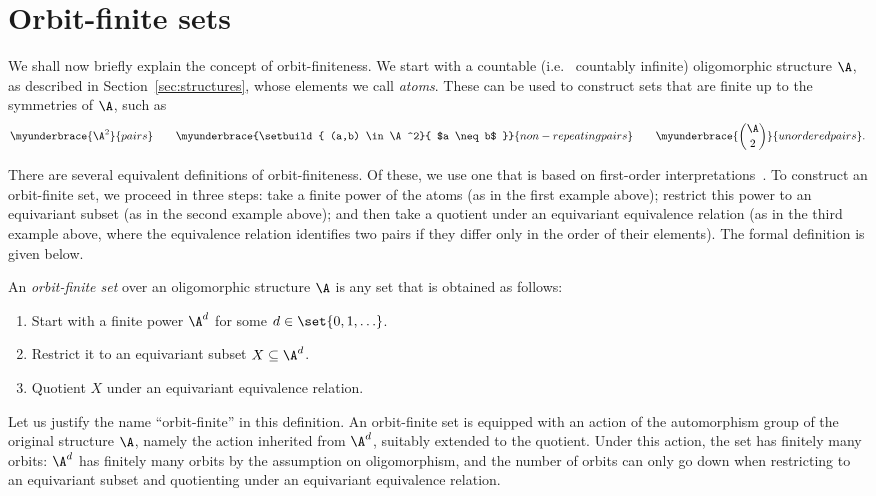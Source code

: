 \section{Orbit-finite sets}
\label{sec:orbit-finite-sets}
We shall now briefly explain the concept of orbit-finiteness.
We start with a countable (i.e.~ countably infinite) oligomorphic structure $\A$, as described in Section~\ref{sec:structures}, whose elements we call \emph{atoms}. 
These can be used to construct sets that are finite up to the symmetries of $\A$, such as
\begin{align*}
   \myunderbrace{\A^2}{pairs}
   \qquad 
   \myunderbrace{\setbuild{ (a,b) \in \A^2}{ $a \neq b$ }}{non-repeating pairs}
   \qquad 
   \myunderbrace{\binom \A 2}{unordered pairs}.
\end{align*}

There are several equivalent definitions of orbit-finiteness. 
Of these, we use one that is based on first-order interpretations~\cite[Sec.~4.3]{hodges1993model}. 
To construct an orbit-finite set, we proceed in three steps: 
take a finite power of the atoms (as in the first example above); 
restrict this power to an equivariant subset (as in the second example above); 
and then take a quotient under an equivariant equivalence relation (as in the third example above, where the equivalence relation identifies two pairs if they differ only in the order of their elements). 
The formal definition is given below.

 \begin{definition}\label{def:orbit-finite-set}
    An \emph{orbit-finite set} over an oligomorphic structure $\A$ is any set that is obtained as follows: 
    \begin{enumerate}
        \item Start with a finite power $\A^d$ for some $d \in \set{0,1,\ldots}$.
        \item Restrict it to an equivariant subset $X \subseteq \A^d$.
        \item Quotient $X$ under an equivariant equivalence relation. 
    \end{enumerate}
 \end{definition}

Let us justify the name ``orbit-finite'' in this definition. 
An orbit-finite set is equipped with an action of the automorphism group of the original structure $\A$, namely the action inherited from $\A^d$, suitably extended to the quotient. 
Under this action, the set has finitely many orbits: 
$\A^d$ has finitely many orbits by the assumption on oligomorphism, 
and the number of orbits can only go down when restricting to an equivariant subset and quotienting under an equivariant equivalence relation. 
  
